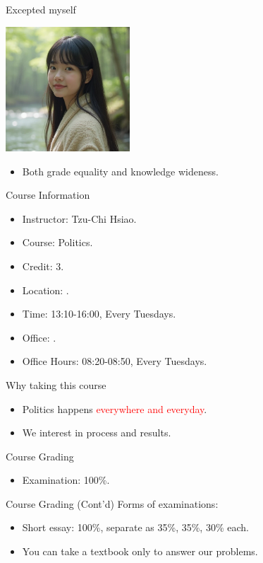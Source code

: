 \documentclass{beamer}
\begin{document}
\begin{frame}{Excepted myself}
\begin{center}
\includegraphics[width=0.35\textwidth]{tchsiao.png}
\end{center}
\begin{itemize}
\item Both grade equality and knowledge wideness.
\end{itemize}
\end{frame}
\begin{frame}{Course Information}
\begin{itemize}
\item Instructor: Tzu-Chi Hsiao.
\item Course: Politics.
\item Credit: 3.
\item Location: .
\item Time: 13:10-16:00, Every Tuesdays.
\item Office: .
\item Office Hours: 08:20-08:50, Every Tuesdays.
\end{itemize}
\end{frame}
\begin{frame}{Why taking this course}
\begin{itemize}
\item Politics happens \textcolor{red}{everywhere and everyday}.
\item We interest in process and results.
\end{itemize}
\end{frame}
\begin{frame}{Course Grading}
\begin{itemize}
\item Examination: 100\%.
\end{itemize}
\end{frame}
\begin{frame}{Course Grading (Cont'd)}
Forms of examinations:
\begin{itemize}
\item Short essay: 100\%, separate as 35\%, 35\%, 30\% each.
\item You can take a textbook only to answer our problems.
\end{itemize}
\end{frame}
\end{document}
